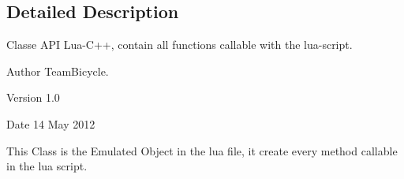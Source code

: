 \subsection{Detailed Description}
Classe API Lua-\/C++, contain all functions callable with the lua-\/script. \begin{DoxyAuthor}{Author}
TeamBicycle. 
\end{DoxyAuthor}
\begin{DoxyVersion}{Version}
1.0 
\end{DoxyVersion}
\begin{DoxyDate}{Date}
14 May 2012
\end{DoxyDate}
This Class is the Emulated Object in the lua file, it create every method callable in the lua script. 